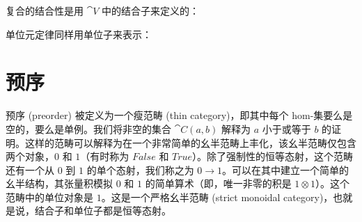 \noindent
复合的结合性是用 $\cat{V}$ 中的结合子来定义的：

\begin{figure}[H]
  \centering
\end{figure}

\noindent
单位元定律同样用单位子来表示：

\begin{figure}[H]
  \centering
  \begin{subfigure}
    \centering
  \end{subfigure}
  \hspace{1cm}
  \begin{subfigure}
    \centering
  \end{subfigure}
\end{figure}

\section{预序}

预序 (preorder) 被定义为一个瘦范畴 (thin category)，即其中每个 hom-集要么是空的，要么是单例。我们将非空的集合 $\cat{C}(a, b)$ 解释为 $a$ 小于或等于 $b$ 的证明。这样的范畴可以解释为在一个非常简单的幺半范畴上丰化，该幺半范畴仅包含两个对象，$0$ 和 $1$（有时称为 $\mathit{False}$ 和 $\mathit{True}$）。除了强制性的恒等态射，这个范畴还有一个从 $0$ 到 $1$ 的单个态射，我们称之为 $0 \to 1$。可以在其中建立一个简单的幺半结构，其张量积模拟 $0$ 和 $1$ 的简单算术（即，唯一非零的积是 $1 \otimes 1$）。这个范畴中的单位对象是 $1$。这是一个严格幺半范畴 (strict monoidal category)，也就是说，结合子和单位子都是恒等态射。

